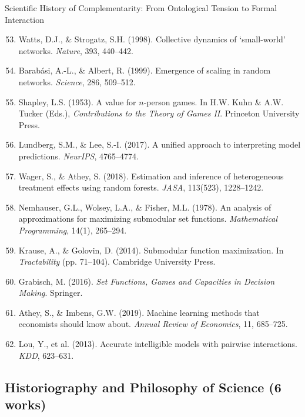 \begin{chapter}{Scientific History of Complementarity: From Ontological Tension to Formal Interaction}
\begin{enumerate}
    \setcounter{enumi}{52}
    \item Watts, D.J., \& Strogatz, S.H. (1998). Collective dynamics of `small-world' networks. \textit{Nature}, 393, 440--442.

    \item Barabási, A.-L., \& Albert, R. (1999). Emergence of scaling in random networks. \textit{Science}, 286, 509--512.

    \item Shapley, L.S. (1953). A value for $n$-person games. In H.W. Kuhn \& A.W. Tucker (Eds.), \textit{Contributions to the Theory of Games II}. Princeton University Press.

    \item Lundberg, S.M., \& Lee, S.-I. (2017). A unified approach to interpreting model predictions. \textit{NeurIPS}, 4765--4774.

    \item Wager, S., \& Athey, S. (2018). Estimation and inference of heterogeneous treatment effects using random forests. \textit{JASA}, 113(523), 1228--1242.

    \item Nemhauser, G.L., Wolsey, L.A., \& Fisher, M.L. (1978). An analysis of approximations for maximizing submodular set functions. \textit{Mathematical Programming}, 14(1), 265--294.

    \item Krause, A., \& Golovin, D. (2014). Submodular function maximization. In \textit{Tractability} (pp. 71--104). Cambridge University Press.

    \item Grabisch, M. (2016). \textit{Set Functions, Games and Capacities in Decision Making}. Springer.

    \item Athey, S., \& Imbens, G.W. (2019). Machine learning methods that economists should know about. \textit{Annual Review of Economics}, 11, 685--725.

    \item Lou, Y., et al. (2013). Accurate intelligible models with pairwise interactions. \textit{KDD}, 623--631.
\end{enumerate}

\subsection{Historiography and Philosophy of Science (6 works)}


\end{chapter}
